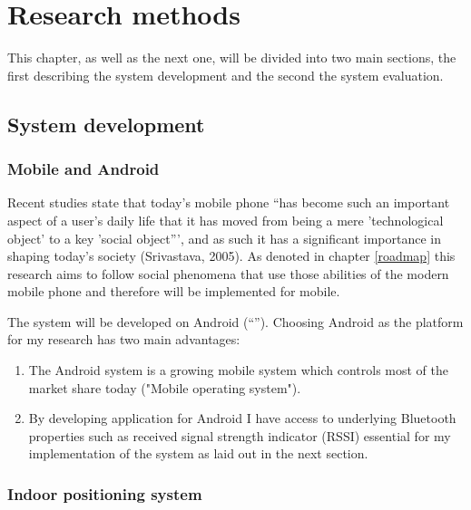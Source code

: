 \section{Research methods}

This chapter, as well as the next one, will be divided into two main sections, the first describing the system development and the second the system evaluation.

\subsection{System development}

\subsubsection{Mobile and Android}


Recent studies state that today's mobile phone ``has become such an important aspect of a user's daily life that it has moved from being a mere 'technological object' to a key 'social object''', and as such it has a significant importance in shaping today's society (Srivastava, 2005). As denoted in chapter \ref{roadmap} this research aims to follow social phenomena that use those abilities of the modern mobile phone and therefore will be implemented for mobile.

The system will be developed on Android (``''). Choosing Android as the platform for my research has two main advantages:
\begin{enumerate}
	\item The Android system is a growing mobile system which controls most of the market share today ("Mobile operating system").
	\item By developing application for Android I have access to underlying Bluetooth properties such as received signal strength indicator (RSSI) essential for my implementation of the system as laid out in the next section.
\end{enumerate}

\subsubsection{Indoor positioning system}\label{methods:ips}


